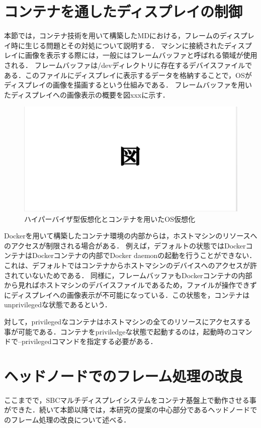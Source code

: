 \section{コンテナを通したディスプレイの制御}
本節では，コンテナ技術を用いて構築したMDにおける，フレームのディスプレイ時に生じる問題とその対処について説明する．
マシンに接続されたディスプレイに画像を表示する際には，一般にはフレームバッファと呼ばれる領域が使用される．
フレームバッファは/devディレクトリに存在するデバイスファイルである．このファイルにディスプレイに表示するデータを格納することで，OSがディスプレイの画像を描画するという仕組みである．
フレームバッファを用いたディスプレイへの画像表示の概要を図xxxに示す．

\begin{figure}[H]
    \hspace*{\fill}
    \includegraphics[width=\linewidth]{./fig/dummy.eps}
    \hspace*{\fill}
    \caption{ハイパーバイザ型仮想化とコンテナを用いたOS仮想化}
\end{figure}

Dockerを用いて構築したコンテナ環境の内部からは，ホストマシンのリソースへのアクセスが制限される場合がある．
例えば，デフォルトの状態ではDockerコンテナはDockerコンテナの内部でDocker daemonの起動を行うことができない．
これは、デフォルトではコンテナからホストマシンのデバイスへのアクセスが許されていないためである．
同様に，フレームバッファもDockerコンテナの内部から見ればホストマシンのデバイスファイルであるため，ファイルが操作できずにディスプレイへの画像表示が不可能になっている．この状態を，コンテナはunprivilegedな状態であるという．

対して，privilegedなコンテナはホストマシンの全てのリソースにアクセスする事が可能である．コンテナをpriviledgeな状態で起動するのは，起動時のコマンドで--privilegedコマンドを指定する必要がある．

\section{ヘッドノードでのフレーム処理の改良}
ここまでで，SBCマルチディスプレイシステムをコンテナ基盤上で動作させる事ができた．続いて本節以降では，本研究の提案の中心部分であるヘッドノードでのフレーム処理の改良について述べる．

